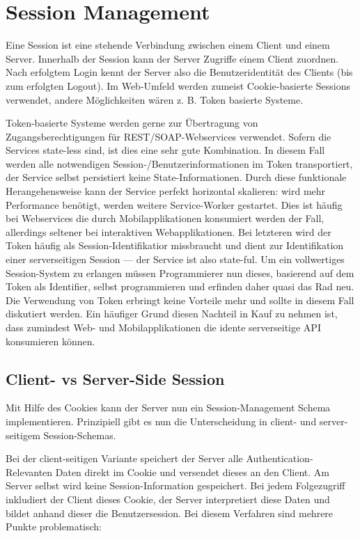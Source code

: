\chapter{Session Management}

Eine Session ist eine stehende Verbindung zwischen einem Client und einem Server. Innerhalb der Session kann der Server Zugriffe einem Client zuordnen. Nach erfolgtem Login kennt der Server also die Benutzeridentität des Clients (bis zum erfolgten Logout). Im Web-Umfeld werden zumeist Cookie-basierte Sessions verwendet, andere Möglichkeiten wären z. B. Token basierte Systeme.

Token-basierte Systeme werden gerne zur Übertragung von Zugangsberechtigungen für REST/SOAP-Webservices verwendet. Sofern die Services state-less sind, ist dies eine sehr gute Kombination. In diesem Fall werden alle notwendigen Session-/Benutzerinformationen im Token transportiert, der Service selbst persistiert keine State-Informationen. Durch diese funktionale Herangehensweise kann der Service perfekt horizontal skalieren: wird mehr Performance benötigt, werden weitere Service-Worker gestartet. Dies ist häufig bei Webservices die durch Mobilapplikationen konsumiert werden der Fall, allerdings seltener bei interaktiven Webapplikationen. Bei letzteren wird der Token häufig als Session-Identifikatior missbraucht und dient zur Identifikation einer serverseitigen Session --- der Service ist also state-ful. Um ein vollwertiges Session-System zu erlangen müssen Programmierer nun dieses, basierend auf dem Token als Identifier, selbst programmieren und erfinden daher quasi das Rad neu. Die Verwendung von Token erbringt keine Vorteile mehr und sollte in diesem Fall diskutiert werden. Ein häufiger Grund diesen Nachteil in Kauf zu nehmen ist, dass zumindest Web- und Mobilapplikationen die idente serverseitige API konsumieren können.

\section{Client- vs Server-Side Session}

Mit Hilfe des Cookies kann der Server nun ein Session-Management Schema implementieren. Prinzipiell gibt es nun die Unterscheidung in client- und server-seitigem Session-Schemas.

Bei der client-seitigen Variante speichert der Server alle Authentication-Relevanten Daten direkt im Cookie und versendet dieses an den Client. Am Server selbst wird keine Session-Information gespeichert. Bei jedem Folgezugriff inkludiert der Client dieses Cookie, der Server interpretiert diese Daten und bildet anhand dieser die Benutzersession. Bei diesem Verfahren sind mehrere Punkte problematisch:

